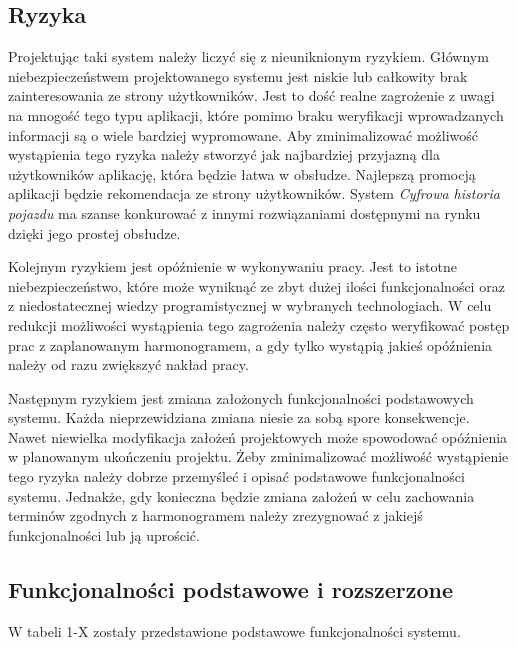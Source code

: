 \documentclass[12pt]{article}
\begin{document}
\subsection{Ryzyka}
Projektując taki system należy liczyć się z nieuniknionym ryzykiem. Głównym niebezpieczeństwem projektowanego systemu jest niskie lub całkowity brak zainteresowania ze strony użytkowników. Jest to dość realne zagrożenie z uwagi na mnogość tego typu aplikacji, które pomimo braku weryfikacji wprowadzanych informacji są o wiele bardziej wypromowane. Aby zminimalizować możliwość wystąpienia tego ryzyka należy stworzyć jak najbardziej przyjazną dla użytkowników aplikację, która będzie łatwa w obsłudze. Najlepszą promocją aplikacji będzie rekomendacja ze strony użytkowników. System \textit{ Cyfrowa historia pojazdu} ma szanse konkurować z innymi rozwiązaniami dostępnymi na rynku dzięki jego prostej obsłudze.

Kolejnym ryzykiem jest opóźnienie w wykonywaniu pracy. Jest to istotne niebezpieczeństwo, które może wyniknąć ze zbyt dużej ilości funkcjonalności oraz z niedostatecznej wiedzy programistycznej w wybranych technologiach. W celu redukcji możliwości wystąpienia tego zagrożenia należy często weryfikować postęp prac z zaplanowanym harmonogramem, a gdy tylko wystąpią jakieś opóźnienia należy od razu zwiększyć nakład pracy.

Następnym ryzykiem jest zmiana założonych funkcjonalności podstawowych systemu. Każda nieprzewidziana zmiana niesie za sobą spore konsekwencje. Nawet niewielka modyfikacja założeń projektowych może spowodować opóźnienia w planowanym ukończeniu projektu. Żeby zminimalizować możliwość wystąpienie tego ryzyka należy dobrze przemyśleć i opisać podstawowe funkcjonalności systemu. Jednakże, gdy konieczna będzie zmiana założeń w celu zachowania terminów zgodnych z harmonogramem należy zrezygnować z jakiejś funkcjonalności lub ją uprościć.

\subsection{Funkcjonalności podstawowe i rozszerzone}

W tabeli 1-X zostały przedstawione podstawowe funkcjonalności systemu.
\end{document}
